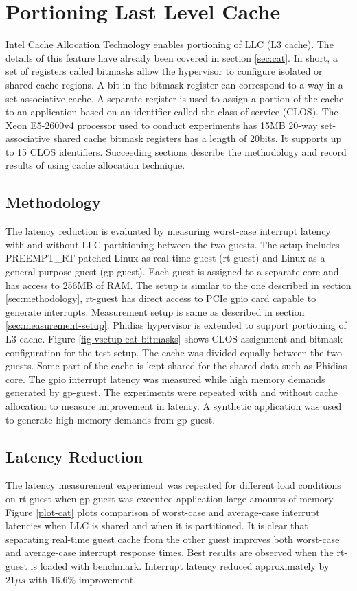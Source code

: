 

\section{Portioning Last Level Cache}
Intel Cache Allocation Technology enables portioning of LLC (L3 cache).
The details of this feature have already been covered in section \ref{sec:cat}.
In short, a set of registers called bitmasks allow the hypervisor to configure isolated or shared cache regions.
A bit in the bitmask register can correspond to a way in a set-associative cache.
A separate register is used to assign a portion of the cache to an application based on an identifier called the class-of-service (CLOS).
The Xeon E5-2600v4 processor used to conduct experiments has 15MB 20-way set-associative shared cache bitmask registers has a length of 20bits. 
It supports up to 15 CLOS identifiers.
Succeeding sections describe the methodology and record results of using cache allocation technique.


\subsection{Methodology}

The latency reduction is evaluated by measuring worst-case interrupt latency with and without LLC partitioning between the two guests.
The setup includes PREEMPT\_RT patched Linux as real-time guest (rt-guest)
and Linux as a general-purpose guest (gp-guest). 
Each guest is assigned to a separate core and has access to 256MB of RAM.
The setup is similar to the one described in section \ref{sec:methodology}, rt-guest has direct access to PCIe gpio card capable to generate interrupts. 
Measurement setup is same as described in section \ref{sec:measurement-setup}.
Phidias hypervisor is extended to support portioning of L3 cache. 
Figure \ref{fig-vsetup-cat-bitmasks} shows CLOS assignment and bitmask configuration for the test setup.
The cache was divided equally between the two guests. Some part of the cache is kept shared for the shared data such as Phidias core.
The gpio interrupt latency was measured while high memory demands generated by gp-guest. 
The experiments were repeated with and without cache allocation to measure improvement in latency.
A synthetic application was used to generate high memory demands from gp-guest.

\subsection{Latency Reduction}

The latency measurement experiment was repeated for different load conditions on rt-guest when gp-guest was executed application large amounts of memory. 
Figure \ref{plot-cat} plots comparison of worst-case and average-case interrupt latencies when LLC is shared and when it is partitioned. 
It is clear that separating real-time guest cache from the other guest improves both worst-case and average-case interrupt response times.
Best results are observed when the rt-guest is loaded with \mforkops{} benchmark. 
Interrupt latency reduced approximately by $21\mu{}s$ with $16.6\%$ improvement.

